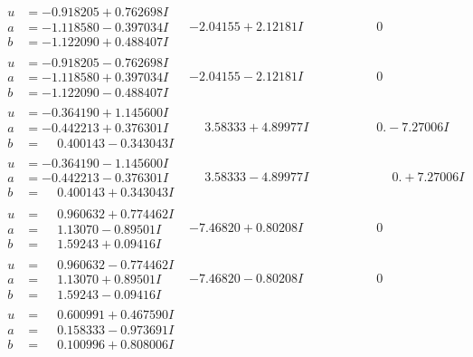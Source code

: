 \documentclass[1p]{elsarticle_modified}
\theoremstyle{definition}
\begin{document}
$$\begin{array}{c|c|c}
\begin{aligned}
u &= -0.918205 + 0.762698 I \\
a &= -1.118580 - 0.397034 I \\
b &= -1.122090 + 0.488407 I\end{aligned}
 & -2.04155 + 2.12181 I & \phantom{-0.000000 } 0 \\ \hline\begin{aligned}
u &= -0.918205 - 0.762698 I \\
a &= -1.118580 + 0.397034 I \\
b &= -1.122090 - 0.488407 I\end{aligned}
 & -2.04155 - 2.12181 I & \phantom{-0.000000 } 0 \\ \hline\begin{aligned}
u &= -0.364190 + 1.145600 I \\
a &= -0.442213 + 0.376301 I \\
b &= \phantom{-}0.400143 - 0.343043 I\end{aligned}
 & \phantom{-}3.58333 + 4.89977 I & \phantom{-0.000000 } 0. - 7.27006 I \\ \hline\begin{aligned}
u &= -0.364190 - 1.145600 I \\
a &= -0.442213 - 0.376301 I \\
b &= \phantom{-}0.400143 + 0.343043 I\end{aligned}
 & \phantom{-}3.58333 - 4.89977 I & \phantom{-0.000000 -}0. + 7.27006 I \\ \hline\begin{aligned}
u &= \phantom{-}0.960632 + 0.774462 I \\
a &= \phantom{-}1.13070 - 0.89501 I \\
b &= \phantom{-}1.59243 + 0.09416 I\end{aligned}
 & -7.46820 + 0.80208 I & \phantom{-0.000000 } 0 \\ \hline\begin{aligned}
u &= \phantom{-}0.960632 - 0.774462 I \\
a &= \phantom{-}1.13070 + 0.89501 I \\
b &= \phantom{-}1.59243 - 0.09416 I\end{aligned}
 & -7.46820 - 0.80208 I & \phantom{-0.000000 } 0 \\ \hline\begin{aligned}
u &= \phantom{-}0.600991 + 0.467590 I \\
a &= \phantom{-}0.158333 - 0.973691 I \\
b &= \phantom{-}0.100996 + 0.808006 I\end{aligned}

\end{array}$$
\end{document}
